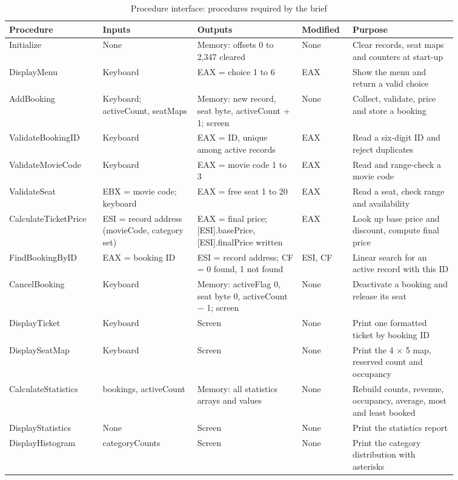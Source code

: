 \documentclass{thesis-library}
\newcommand{\tablefont}{\footnotesize\setstretch{1.15}\hyphenpenalty=10000\relax}
\begin{document}
\begin{table}[H]
\centering
\tablefont
\caption{Procedure interface: procedures required by the brief}
\label{tab:iface-req}
\begin{tabular}{|L{0.16\linewidth}|L{0.19\linewidth}|L{0.21\linewidth}|L{0.09\linewidth}|L{0.21\linewidth}|}
\hline
\textbf{Procedure} & \textbf{Inputs} & \textbf{Outputs} & \textbf{Modified} & \textbf{Purpose} \\
\hline
Initialize & None & Memory: offsets 0 to 2,347 cleared & None & Clear records, seat maps and counters at start-up \\
\hline
DisplayMenu & Keyboard & EAX = choice 1 to 6 & EAX & Show the menu and return a valid choice \\
\hline
AddBooking & Keyboard; activeCount, seatMaps & Memory: new record, seat byte, activeCount + 1; screen & None & Collect, validate, price and store a booking \\
\hline
ValidateBookingID & Keyboard & EAX = ID, unique among active records & EAX & Read a six-digit ID and reject duplicates \\
\hline
ValidateMovieCode & Keyboard & EAX = movie code 1 to 3 & EAX & Read and range-check a movie code \\
\hline
ValidateSeat & EBX = movie code; keyboard & EAX = free seat 1 to 20 & EAX & Read a seat, check range and availability \\
\hline
CalculateTicketPrice & ESI = record address (movieCode, category set) & EAX = final price; [ESI].basePrice, [ESI].finalPrice written & EAX & Look up base price and discount, compute final price \\
\hline
FindBookingByID & EAX = booking ID & ESI = record address; CF = 0 found, 1 not found & ESI, CF & Linear search for an active record with this ID \\
\hline
CancelBooking & Keyboard & Memory: activeFlag 0, seat byte 0, activeCount $-$ 1; screen & None & Deactivate a booking and release its seat \\
\hline
DisplayTicket & Keyboard & Screen & None & Print one formatted ticket by booking ID \\
\hline
DisplaySeatMap & Keyboard & Screen & None & Print the 4 $\times$ 5 map, reserved count and occupancy \\
\hline
CalculateStatistics & bookings, activeCount & Memory: all statistics arrays and values & None & Rebuild counts, revenue, occupancy, average, most and least booked \\
\hline
DisplayStatistics & None & Screen & None & Print the statistics report \\
\hline
DisplayHistogram & categoryCounts & Screen & None & Print the category distribution with asterisks \\
\hline
\end{tabular}
\end{table}
\end{document}
